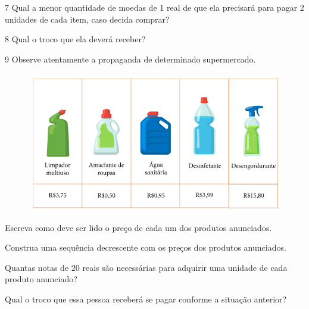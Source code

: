 \num{7} 
  Qual a menor quantidade de moedas de 1 real de que ela precisará para
  pagar 2 unidades de cada item, caso decida comprar?


\num{8} Qual o troco que ela deverá receber?


\pagebreak
\num{9} Observe atentamente a propaganda de determinado supermercado.

\begin{figure}[htpb!]
\includegraphics[width=\textwidth]{../ilustracoes/MAT5/SAEB_5ANO_MAT_figura55.png}
\end{figure}

\begin{escolha}
\item
  Escreva como deve ser lido o preço de cada um dos produtos anunciados.







\item
  Construa uma sequência decrescente com os preços dos produtos anunciados.


\item
  Quantas notas de 20 reais são necessárias para adquirir uma unidade de
  cada produto anunciado?


\item
  Qual o troco que essa pessoa receberá se pagar conforme a situação anterior?

\end{escolha}

